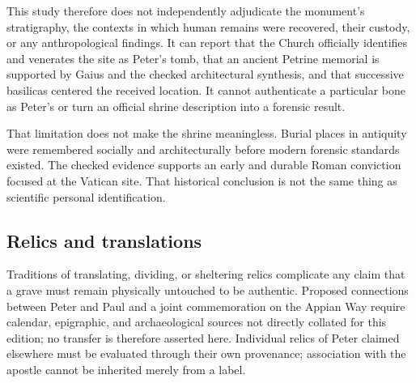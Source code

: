 This study therefore does not independently adjudicate the monument's
stratigraphy, the contexts in which human remains were recovered, their
custody, or any anthropological findings. It can report that the Church
officially identifies and venerates the site as Peter's tomb, that an ancient
Petrine memorial is supported by Gaius and the checked architectural
synthesis, and that successive basilicas centered the received location. It
cannot authenticate a particular bone as Peter's or turn an official shrine
description into a forensic result.

That limitation does not make the shrine meaningless. Burial places in
antiquity were remembered socially and architecturally before modern forensic
standards existed. The checked evidence supports an early and durable Roman
conviction focused at the Vatican site. That historical conclusion is not the
same thing as scientific personal identification.

\subsection{Relics and translations}

Traditions of translating, dividing, or sheltering relics complicate any claim
that a grave must remain physically untouched to be authentic. Proposed
connections between Peter and Paul and a joint commemoration on the Appian Way
require calendar, epigraphic, and archaeological sources not directly collated
for this edition; no transfer is therefore asserted here. Individual relics
of Peter claimed elsewhere must be evaluated through their own provenance;
association with the apostle cannot be inherited merely from a label.

